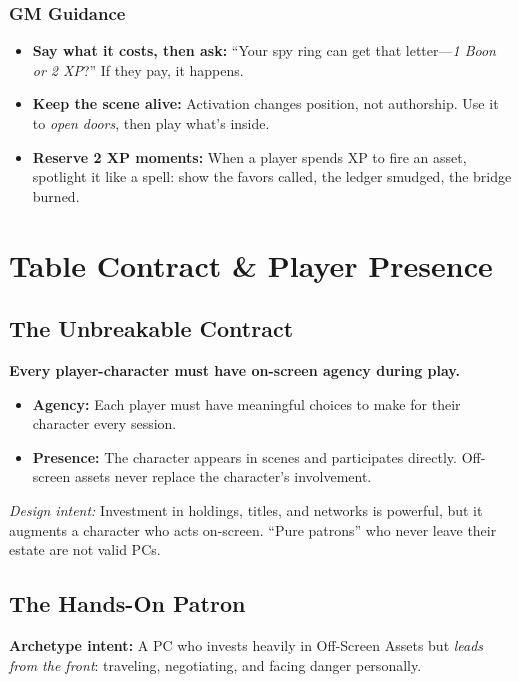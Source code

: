 \documentclass[12pt]{book}
\begin{document}
\subsection*{GM Guidance}
\begin{itemize}
  \item \textbf{Say what it costs, then ask:} ``Your spy ring can get that letter—\emph{1 Boon or 2 XP}?'' If they pay, it happens.
  \item \textbf{Keep the scene alive:} Activation changes position, not authorship. Use it to \emph{open doors}, then play what’s inside.
  \item \textbf{Reserve 2 XP moments:} When a player spends XP to fire an asset, spotlight it like a spell: show the favors called, the ledger smudged, the bridge burned.
\end{itemize}

\chapter{Table Contract \& Player Presence}

\section{The Unbreakable Contract}
\textbf{Every player-character must have on-screen agency during play.}
\begin{itemize}
  \item \textbf{Agency:} Each player must have meaningful choices to make for their character every session.
  \item \textbf{Presence:} The character appears in scenes and participates directly. Off-screen assets never replace the character’s involvement.
\end{itemize}
\noindent
\textit{Design intent:} Investment in holdings, titles, and networks is powerful, but it augments a character who acts on-screen. “Pure patrons” who never leave their estate are not valid PCs.

\section{The Hands-On Patron}
\textbf{Archetype intent:} A PC who invests heavily in Off-Screen Assets but \emph{leads from the front}: traveling, negotiating, and facing danger personally.
\end{document}
